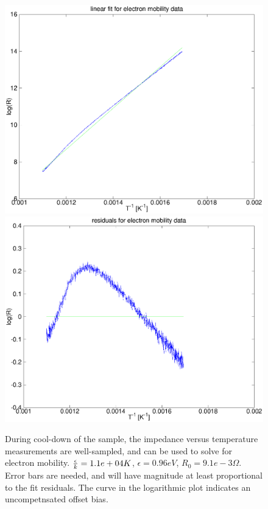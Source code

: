     \begin{figure}
    
    \includegraphics[scale=0.4]{images/electron_mobility.eps} 
    \includegraphics[scale=0.4]{images/electron_mobility_residual.eps}
    \label{f:emobility}
    \caption{During cool-down of the sample, the impedance versus temperature measurements are well-sampled, and can be used to solve for electron mobility.  ${\epsilon\over{k}} = 1.1e+04 K$, $\epsilon = 0.96 eV$, $R_0 = 9.1e-3\Omega$.  Error bars are needed, and will have magnitude at least proportional to the fit residuals.  The curve in the logarithmic plot indicates an uncompetnsated offset bias.}
    \end{figure}

